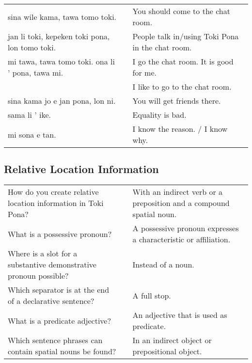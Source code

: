 \begin{supertabular}{p{5,5cm}|ll}
    sina wile kama, tawa tomo toki.                  &  & You should come to the chat room.                \\
    jan li toki, kepeken toki pona, lon tomo toki.   &  & People talk in/using Toki Pona in the chat room. \\
    mi tawa, tawa tomo toki. ona li ' pona, tawa mi. &  & I go the chat room. It is good for me.           \\
                                                     &  & I like to go to the chat room.                   \\
    sina kama jo e jan pona, lon ni.                 &  & You will get friends there.                      \\
    sama li ' ike.                                   &  & Equality is bad.                                 \\
    mi sona e tan.                                   &  & I know the reason. / I know why.                 \\
\end{supertabular}

\newpage

\subsection*{Relative Location Information}
\label{'other_prepositions'}

\begin{supertabular}{p{5,5cm}|ll}
    How do you create relative location information in Toki Pona?     &  & With an indirect verb or a preposition and a compound spatial noun. \\
    What is a possessive pronoun?                                     &  & A possessive pronoun expresses a characteristic or affiliation.     \\
    Where is a slot for a substantive demonstrative pronoun possible? &  & Instead of a noun.                                                  \\
    Which separator is at the end of a declarative sentence?          &  & A full stop.                                                        \\
    What is a predicate adjective?                                    &  & An adjective that is used as predicate.                             \\
    Which sentence phrases can contain spatial nouns be found?        &  & In an indirect object or prepositional object.                      \\
\end{supertabular}

